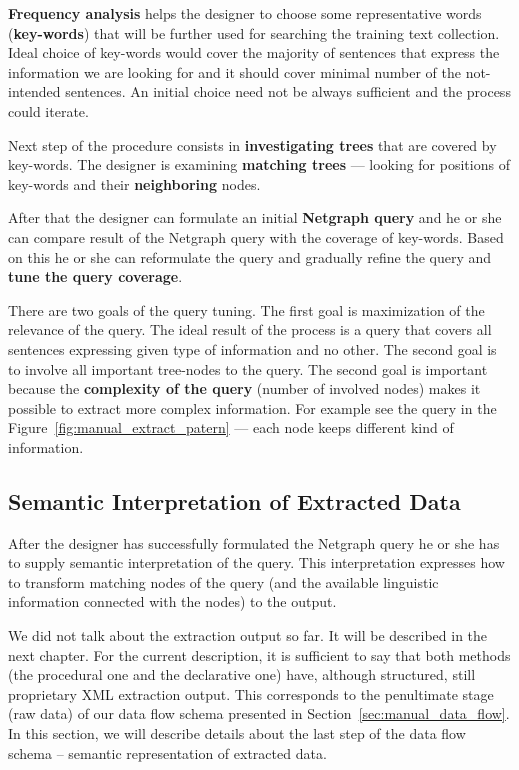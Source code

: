 \textbf{Frequency analysis} helps the designer to choose some representative words (\textbf{key-words}) that will be further used for searching the training text collection. Ideal choice of key-words would cover the majority of sentences that express the information we are looking for and it should cover minimal number of the not-intended sentences. An initial choice need not be always sufficient and the process could iterate.

Next step of the procedure consists in \textbf{investigating trees} that are covered by key-words. The designer is examining \textbf{matching trees} --- looking for positions of key-words and their \textbf{neighboring} nodes.

After that the designer can formulate an initial \textbf{Netgraph query} and he or she can compare result of the Netgraph query with the coverage of key-words. Based on this he or she can reformulate the query and gradually refine the query and \textbf{tune the query coverage}.

There are two goals of the query tuning. The first goal is maximization of the relevance of the query. The ideal result of the process is a query that covers all sentences expressing given type of information and no other. The second goal is to involve all important tree-nodes to the query. The second goal is important because the \textbf{complexity of the query} (number of involved nodes) makes it possible to extract more complex information. For example see the query in the Figure~\ref{fig:manual_extract_patern} --- each node keeps different kind of information.

\pagebreak
\subsection{Semantic Interpretation of Extracted Data} \label{sec:manual_sem_interpret}

After the designer has successfully formulated the Netgraph query he or she has to supply semantic interpretation of the query. This interpretation expresses how to transform matching nodes of the query (and the available linguistic information connected with the nodes) to the output.

We did not talk about the extraction output so far. It will be described in the next chapter. For the current description, it is sufficient to say that both methods (the procedural one and the declarative one) have, although structured, still proprietary XML extraction output. This corresponds to the penultimate stage (raw data) of our data flow schema presented in Section~\ref{sec:manual_data_flow}. In this section, we will describe details about the last step of the data flow schema -- semantic representation of extracted data.

